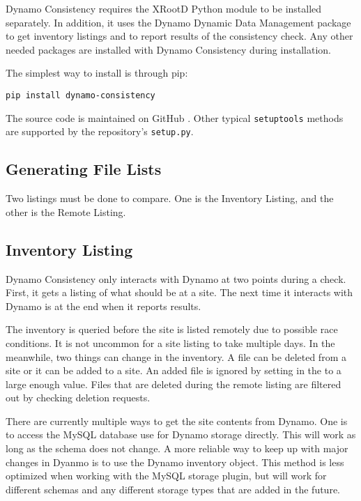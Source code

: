 Dynamo Consistency requires the XRootD \cite{dorigo2005xrootd}
Python module to be installed separately.
In addition, it uses the Dynamo Dynamic Data Management package to get inventory listings
and to report results of the consistency check.
Any other needed packages are installed with Dynamo Consistency during installation.

The simplest way to install is through pip:

\begin{verbatim}
pip install dynamo-consistency
\end{verbatim}

The source code is maintained on GitHub \cite{}.
Other typical \texttt{setuptools} methods are supported by the repository’s \texttt{setup.py}.

\subsection{Generating File Lists}

Two listings must be done to compare.
One is the Inventory Listing,
and the other is the Remote Listing.


\subsection{Inventory Listing}
\label{\detokenize{listing:inventory-listing}}\label{\detokenize{listing:inventory-listing-ref}}
Dynamo Consistency only interacts with Dynamo at two points during a check.
First, it gets a listing of what should be at a site.
The next time it interacts with Dynamo is at the end when it reports results.

The inventory is queried before the site is listed remotely due to possible race conditions.
It is not uncommon for a site listing to take multiple days.
In the meanwhile, two things can change in the inventory.
A file can be deleted from a site or it can be added to a site.
An added file is ignored by setting  in the {\hyperref[\detokenize{cms:consistency-config-ref}]{}} to a large enough value.
Files that are deleted during the remote listing are filtered out by checking deletion requests.

There are currently multiple ways to get the site contents from Dynamo.
One is to access the MySQL database use for Dynamo storage directly.
This will work as long as the schema does not change.
A more reliable way to keep up with major changes in Dyanmo is to use the Dynamo inventory object.
This method is less optimized when working with the MySQL storage plugin,
but will work for different schemas and any different storage types that are added in the future.

